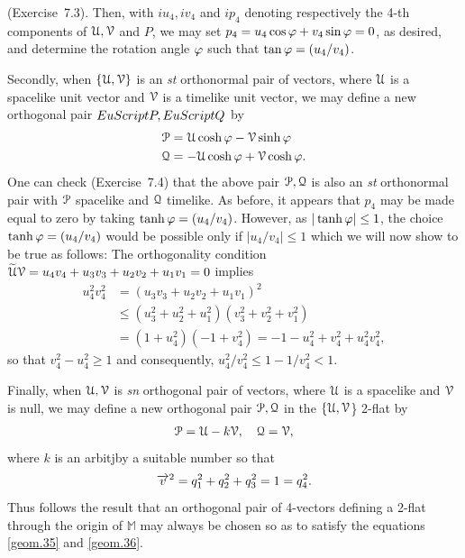 (Exercise~7.3). Then, with $iu_4, iv_4$ and $ip_4$ 
denoting respectively  the 4-th components of 
$\EuScript{U}, \EuScript{V}$ and $P$,  we may set $p_4 
= u_4\cos\gkf +v_4\sin\gkf=0$, as desired,  and 
determine the rotation angle $\gkf$ such that 
$\tan\gkf=(u_4/v_4)$.

 Secondly, when  
$\{\EuScript{U},\EuScript{V}\}$ is an  \textsl{st} 
orthonormal pair of vectors, where $\EuScript{U}$ is a 
spacelike unit vector and $\EuScript{V}$ is a timelike 
unit vector, we may define a new orthogonal pair 
$EuScript{P},\break EuScript{Q}$ by
\begin{align}\label{geom.127}
&\EuScript{P}= 
\EuScript{U}\cosh\gkf-\EuScript{V}\sinh\gkf\notag\\
&\EuScript{Q}= 
-\EuScript{U}\cosh\gkf+\EuScript{V}\cosh\gkf.
\end{align}
One can check (Exercise~7.4) that the above pair 
$\EuScript{P},\EuScript{Q}$ is also an  \textsl{st} 
orthonormal pair with $\EuScript{P}$ spacelike and 
$\EuScript{Q}$ timelike. As before, it appears that 
$p_4$ may be made equal to zero by taking  
$\tanh\gkf=(u_4/v_4)$. However, as $|\tanh \gkf|\leq 
1$, the choice $\tanh\gkf=(u_4/v_4)$ would be possible 
only if $|u_4/v_4|\leq 1$ which we will now show to be 
true as follows: The orthogonality condition 
$\tilde{\EuScript{U}}\EuScript{V} =u_4v_4 +u_3v_3 
+u_2v_2 +u_1v_1 =0$ implies
\begin{align*}
u_4^2v_4^2&=(u_3v_3+u_2v_2+u_1v_1)^2\\
&\leq(u_3^2+u_2^2+u_ 1 ^ 2 ) 
(v _ 3 ^ 2+v_2^2+v_1^2)\\
& =(1+u_4^2)(-1+v_4^2)=-1-u_4^2+v_4^2
+u_4^2v_4^2,
\end{align*}
so that $v_4^2-u_4^2\geq 1$ and consequently, 
$u_4^2/v_4^2\leq 1-1/v_4^2<1$.

Finally, when 
$\EuScript{U},\EuScript{V}$ is \textsl{sn} orthogonal 
pair 
of vectors, where $\EuScript{U}$ is a spacelike and 
$\EuScript{V}$ is null, we may define a new orthogonal 
pair 
$\EuScript{P},\EuScript{Q}$ in the 
$\{\EuScript{U},\EuScript{V}$\} 2-flat by
\begin{align}\label{geom.128}
\EuScript{P}= \EuScript{U}-k\EuScript{V},\quad 
\EuScript{Q}=\EuScript{V},
\end{align}
where $k$ is an arbitjby a suitable number so that
\begin{align*}
\veca{v}^2=q_1^2+q_2^2+q_3^2= 1=q_4^2.
\end{align*}
Thus follows the result that an orthogonal pair of  
4-vectors defining a 2-flat through the origin of 
$\mathbb{M}$ may always be chosen so as to satisfy the 
equations \eqref{geom.35} and \eqref{geom.36}. \ebx

